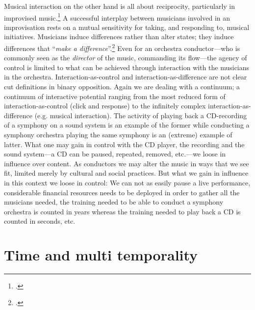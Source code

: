 Musical interaction on the other hand is all about reciprocity, particularly in improvised music.\footcite[See for example][]{monson96} A successful interplay between musicians involved in an improvisation rests on a mutual sensitivity for taking, and responding to, musical initiatives. Musicians induce differences rather than alter states; they induce differences that ``\emph{make a difference}''.\footcite[And, according to Gregory Bateson, a difference that makes a difference is the definition of \emph{Information}][92]{Bateson} Even for an orchestra conductor---who is commonly seen as the \emph{director} of the music, commanding its flow---the agency of control is limited to what can be achieved through interaction with the musicians in the orchestra. Interaction-as-control and interaction-as-difference are not clear cut definitions in binary opposition. Again we are dealing with a continuum; a continuum of interactive potential ranging from the most reduced form of interaction-as-control (click and response) to the infinitely complex interaction-as-difference (e.g. musical interaction). 
The activity of playing back a CD-recording of a symphony on a sound system is an example of the former while conducting a symphony orchestra playing the same symphony is an (extreme) example of latter. What one may gain in control with the CD player, the recording and the sound system---a CD can be paused, repeated, removed, etc.---we loose in influence over content. 
As conductors we may alter the music in ways that we see fit, limited merely by cultural and social practices. But what we gain in influence in this context we loose in control: We can not as easily pause a live performance, considerable financial resources needs to be deployed in order to gather all the musicians needed, the training needed to be able to conduct a symphony orchestra is counted in years whereas the training needed to play back a CD is counted in seconds, etc.


\section{Time and multi temporality}
\label{sec:performing-time}

